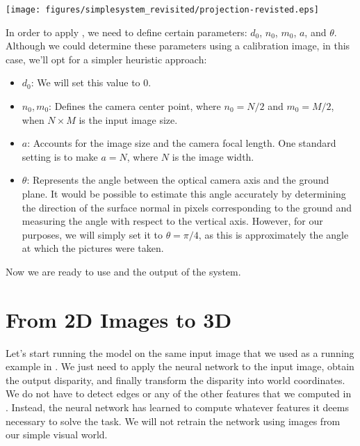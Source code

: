 \centerline{
    \texttt{[image: figures/simplesystem\_revisited/projection-revisted.eps]}
}


In order to apply \eqn{\ref{eq:recoverworldcoord}}, we need to define certain parameters:
$d_0$, $n_0$, $m_0$, $a$, and $\theta$.
Although we could determine these parameters using a calibration image, in this case, we'll opt for a simpler heuristic approach:
\begin{itemize}
    \item $d_0$: We will set this value to 0.
    \item $n_0,m_0$: Defines the camera center point, where $n_0=N/2$ and $m_0=M/2$, when $N \times M$ is the input image size.
    \item $a$: Accounts for the image size and the camera focal length. One standard setting is to make $a = N$, where $N$ is the image width.
    \item $\theta$: Represents the angle between the optical camera axis and the ground plane.
          It would be possible to estimate this angle accurately by determining the direction of the surface normal in pixels corresponding to the ground and measuring the angle with respect to the vertical axis. However, for our purposes, we will simply set it to  $\theta = \pi / 4$, as this is approximately the angle at which the pictures were taken.

\end{itemize}

Now we are ready to use \eqn{\ref{eq:recoverworldcoord}} and the output of the system.

\section{From 2D Images to 3D}


Let's start running the model on the same input image that we used as a running example in \chap{\ref{chapter:simplesystem}}. We just need to apply the neural network to the input image, obtain the output disparity, and finally transform the disparity into world coordinates. We do not have to detect edges or any of the other features that we computed in \chap{\ref{chapter:simplesystem}}. Instead, the neural network has learned to compute whatever features it deems necessary to solve the task. We will not retrain the network using images from our simple visual world.



